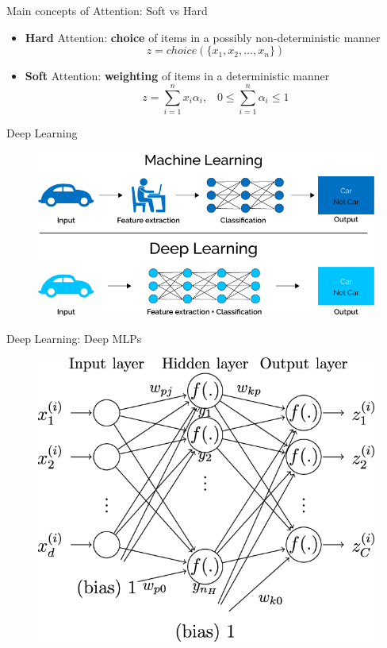 \documentclass[10pt]{beamer}
\begin{document}
\begin{frame}{Main concepts of Attention: Soft vs Hard}
    \begin{itemize}
        \item \textbf{Hard} Attention: \textbf{choice} of items in a possibly non-deterministic manner
            $$z = choice\left(\{x_1, x_2, \ldots, x_n\}\right)$$
        \item \textbf{Soft} Attention: \textbf{weighting} of items in a deterministic manner
            $$z = \sum_{i=1}^{n}{x_i \alpha_i}, \;\;\; 0 \le \sum_{i=1}^{n}{\alpha_i} \le 1$$
    \end{itemize}
\end{frame}

\begin{frame}{Deep Learning}
    \begin{figure}
        \centering
        \includegraphics[width=1.0\linewidth]{./img/dl.png}
    \end{figure}
\end{frame}

\begin{frame}{Deep Learning: Deep MLPs}
    \begin{figure}
        \centering
        \includegraphics[width=0.7\linewidth]{./img/dl3.png}
    \end{figure}
\end{frame}
\end{document}
